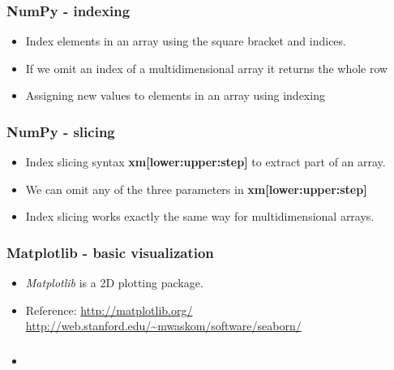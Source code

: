 \documentclass[11pt]{beamer}
\begin{document}
%
\begin{frame}[plain]
    \frametitle{NumPy - indexing}
    \begin{itemize}
        \item[] Index elements in an array using the square bracket and indices. 
        
        
        \item[] If we omit an index of a multidimensional array it returns the whole row
        
        \item[] Assigning new values to elements in an array using indexing
        
    \end{itemize}
\end{frame}
%
\begin{frame}[plain]
    \frametitle{NumPy - slicing}
    \begin{itemize}
        \item[] Index slicing syntax \textbf{xm[lower:upper:step]} to extract part of an array. 
        
        \item[] We can omit any of the three parameters in \textbf{xm[lower:upper:step]}
        
        \item[] Index slicing works exactly the same way for multidimensional arrays.
        
    \end{itemize}
\end{frame}
%
\begin{frame}[plain]
    \frametitle{Matplotlib - basic visualization}
    \begin{itemize}
        \item[] \textit{Matplotlib} is a 2D plotting package.  
        
        
        \item[] Reference: \url{http://matplotlib.org/}\\
        \url{http://web.stanford.edu/~mwaskom/software/seaborn/}
    \end{itemize}
\end{frame}
%
\begin{frame}[plain]
    \frametitle{}
    \begin{itemize}
        \item[] 
    \end{itemize}
\end{frame}
\end{document}
